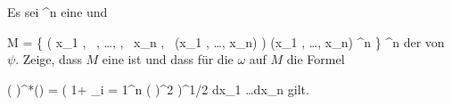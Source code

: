 {

Es sei
\maabbdisp {\psi} {\R^n } {\R
} {}
eine
und

\mavergleichskettedisphandlinks
{\vergleichskettedisphandlinks
{M
}
{ =} { \left\{  \left(  x_1   , \,   , \ldots ,  , \,   x_n , \,   \psi(x_1 , \ldots , x_n)                \right)   \mid  (x_1 , \ldots , x_n) \in \R^n         \right\}
}
{ \subseteq} { \R^n \times \R
}
{ } {
}
{ } {
}
}
{}{}{}
der
von $\psi$. Zeige, dass $M$ eine
 
ist und dass für die
$\omega$ auf $M$ die Formel

\mavergleichskettedisp
{\vergleichskette
{ ( \times \psi)^*(\omega)
}
{ =} { \left(  1+ \sum_{i = 1}^n \left(  {  }  \right)^2  \right)^{1/2} dx_1 \wedge \ldots \wedge dx_n
}
{ } {
}
{ } {
}
{ } {
}
}
{}{}{}
gilt.

}
